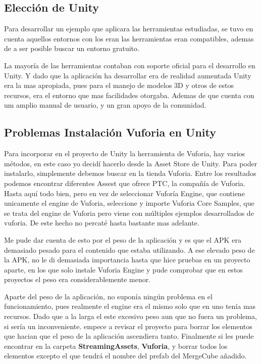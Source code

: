 \subsection{Elección de Unity}
Para desarrollar un ejemplo que aplicara las herramientas estudiadas, se tuvo en cuenta aquellos entornos con los eran las herramientas eran compatibles, ademas de a ser posible buscar un entorno gratuito. 

La mayoría de las herramientas contaban con soporte oficial para el desarrollo en Unity. Y dado que la aplicación ha desarrollar era de realidad aumentada Unity era la mas apropiada, pues para el manejo de modelos 3D y otros de estos recursos, era el entorno que mas facilidades otorgaba. Ademas de que cuenta con um amplio manual de usuario, y un gran apoyo de la comunidad.

\subsection{Problemas Instalación Vuforia en Unity}
Para incorporar en el proyecto de Unity la herramienta de Vuforia, hay varios métodos, en este caso yo decidí hacerlo desde la Asset Store de Unity. Para poder instalarlo, simplemente debemos buscar en la tienda Vuforia. Entre los resultados podemos encontrar diferentes Assest que ofrece PTC, la compañía de Vuforia. Hasta aquí todo bien, pero en vez de seleccionar Vuforía Engine, que contiene unicamente el engine de Vuforia, seleccione y importe Vuforia Core Samples, que se trata del engine de Vuforia pero viene con múltiples ejemplos desarrollados de vuforia. De este hecho no percaté hasta bastante mas adelante. 

Me pude dar cuenta de esto por el peso de la aplicación y es que el APK era demasiado pesado para el contenido que estaba utilizando. A ese elevado peso de la APK, no le di demasiada importancia hasta que hice pruebas en un proyecto aparte, en los que solo instale Vuforia Engine y pude comprobar que en estos proyectos el peso era considerablemente menor.

Aparte del peso de la aplicación, no suponía ningún problema en el funcionamiento, pues realmente el engine era el mismo solo que en uno tenía mas recursos. Dado que a la larga el este excesivo peso aun que no fuera un problema, si sería un inconveniente. empece a revisar el proyecto para borrar los elementos que hacian que el peso de la aplicación ascendiera tanto. Finalmente si les puede encontrar en la carpeta \textbf{StreamingAssets}, \textbf{Vuforia}, y borrar todos los elementos excepto el que tendrá el nombre del prefab del MergeCube añadido.

